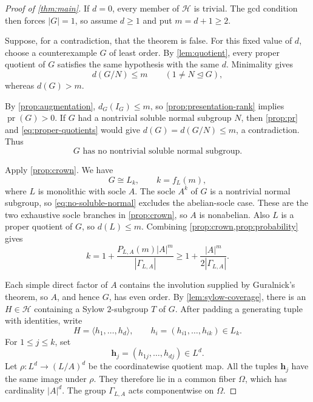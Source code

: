 \documentclass[11pt,reqno]{amsart}
\theoremstyle{remark}
\DeclareMathOperator{\pr}{pr}
\newcommand{\gen}[1]{\langle #1\rangle}
\newcommand{\GammaLA}{\Gamma_{L,A}}
\begin{document}
\begin{proof}[Proof of \cref{thm:main}]
If $d=0$, every member of $\mathcal H$ is trivial.  The gcd condition then
forces $|G|=1$, so assume $d\geq1$ and put $m=d+1\geq2$.

Suppose, for a contradiction, that the theorem is false.  For this fixed
value of $d$, choose a counterexample $G$ of least order.  By
\cref{lem:quotient}, every proper quotient of $G$ satisfies the same
hypothesis with the same $d$.  Minimality gives
\begin{equation}\label{eq:proper-quotients}
 d(G/N)\leq m
 \qquad(1\neq N\unlhd G),
\end{equation}
whereas $d(G)>m$.

By \cref{prop:augmentation}, $d_G(I_G)\leq m$, so
\cref{prop:presentation-rank} implies $\pr(G)>0$.  If $G$ had a nontrivial
soluble normal subgroup $N$, then \cref{prop:pr} and
\eqref{eq:proper-quotients} would give
$d(G)=d(G/N)\leq m$, a contradiction.  Thus
\begin{equation}\label{eq:no-soluble-normal}
 G\text{ has no nontrivial soluble normal subgroup.}
\end{equation}

Apply \cref{prop:crown}.  We have
\[
 G\cong L_k,
 \qquad k=f_L(m),
\]
where $L$ is monolithic with socle $A$.  The socle $A^k$ of $G$ is a
nontrivial normal subgroup, so \eqref{eq:no-soluble-normal} excludes the
abelian-socle case.  These are the two exhaustive socle branches in
\cref{prop:crown}, so \(A\) is nonabelian.  Also \(L\) is a proper quotient
of \(G\), so \(d(L)\leq m\).  Combining
\cref{prop:crown,prop:probability} gives
\begin{equation}\label{eq:lower-k}
 k
 =1+\frac{P_{L,A}(m)|A|^m}{|\GammaLA|}
 \geq 1+\frac{|A|^m}{2|\GammaLA|}.
\end{equation}

Each simple direct factor of $A$ contains the involution supplied by
Guralnick's theorem, so $A$, and hence $G$, has even order.  By
\cref{lem:sylow-coverage}, there is an $H\in\mathcal H$ containing a Sylow
$2$-subgroup $T$ of $G$.  After padding a generating tuple with identities,
write
\[
 H=\gen{h_1,\ldots,h_d},
 \qquad
 h_i=(h_{i1},\ldots,h_{ik})\in L_k.
\]
For $1\leq j\leq k$, set
\[
 \mathbf h_j=(h_{1j},\ldots,h_{dj})\in L^d.
\]
Let $\rho:L^d\to(L/A)^d$ be the coordinatewise quotient map.  All the tuples
$\mathbf h_j$ have the same image under $\rho$.  They therefore lie in a
common fiber $\Omega$, which has cardinality $|A|^d$.  The group $\GammaLA$
acts componentwise on $\Omega$.


\end{proof}
\end{document}
